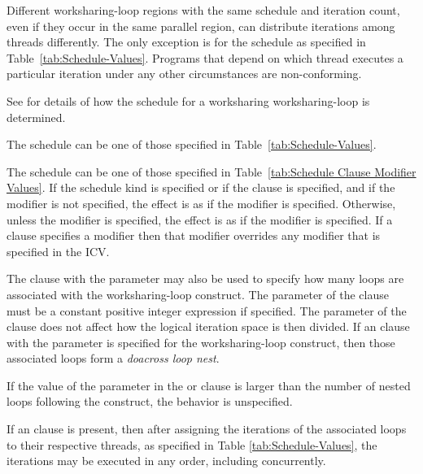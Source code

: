 Different worksharing-loop regions with the same schedule and iteration count, even if
they occur in the same parallel region, can distribute iterations among
threads differently. The only exception is for the  schedule
as specified in Table~\ref{tab:Schedule-Values}. Programs that depend
on which thread executes a particular iteration under any other circumstances
are non-conforming.

See 
for details of how the schedule for a worksharing worksharing-loop is
determined.

The schedule  can be one of those specified in
Table~\ref{tab:Schedule-Values}.

The schedule  can be one of those specified in
Table~\ref{tab:Schedule Clause Modifier Values}. If the
 schedule kind is specified or if the 
clause is specified, and if the  modifier is
not specified, the effect is as if the  modifier
is specified. Otherwise, unless the  modifier is
specified, the effect is as if the  modifier
is specified.
If a  clause specifies a modifier then that modifier overrides
any modifier that is specified in the  ICV.

The  clause with the parameter may also be used to specify
how many loops are associated with the worksharing-loop construct. The parameter of
the  clause must be a constant positive integer expression
if specified. The parameter of the  clause does not
affect how the logical iteration space is then divided. If an 
clause with the parameter is specified for the worksharing-loop construct, then those
associated loops form a \emph{doacross loop nest}.

If the value of the parameter in the  or 
clause is larger than the number of nested loops following the construct,
the behavior is unspecified.

If an  clause is present, then after assigning the
iterations of the associated loops to their respective threads, as specified in
Table \ref{tab:Schedule-Values}, the iterations may be executed in any order,
including concurrently.


\nolinenumbers

